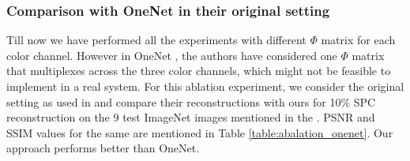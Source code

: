 \documentclass[journal,twoside]{IEEEtran}
\begin{document}
\subsubsection{Comparison with OneNet in their original setting}
Till now we have performed all the experiments with different $\Phi$ matrix for each color channel. However in OneNet \cite{chang2017one}, the authors have considered one $\Phi$ matrix that multiplexes across the three color channels, which might not be feasible to implement in a real system. For this ablation experiment, we consider the original setting as used in \cite{chang2017one} and compare their reconstructions with ours for 10\% SPC reconstruction on the 9 test ImageNet images mentioned in the \cite{chang2017one}. PSNR and SSIM values for the same are mentioned in Table \ref{table:abalation_onenet}. Our approach performs better than OneNet. 
\end{document}
